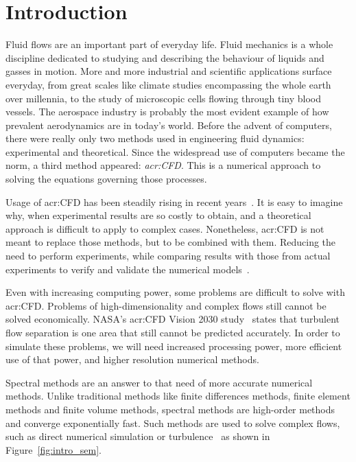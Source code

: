 \chapter{Introduction}

Fluid flows are an important part of everyday life. Fluid mechanics is a whole discipline dedicated
to studying and describing the behaviour of liquids and gasses in motion. More and more industrial
and scientific applications surface everyday, from great scales like climate studies encompassing
the whole earth over millennia, to the study of microscopic cells flowing through tiny blood
vessels. The aerospace industry is probably the most evident example of how prevalent aerodynamics
are in today's world. Before the advent of computers, there were really only two methods used in
engineering fluid dynamics: experimental and theoretical. Since the widespread use of computers
became the norm, a third method appeared: \textit{\acrfull{acr:CFD}}. This is a numerical approach
to solving the equations governing those processes.

Usage of \acrshort{acr:CFD} has been steadily rising in recent years~\cite{Slotnick2014}. It is easy
to imagine why, when experimental results are so costly to obtain, and a theoretical approach is
difficult to apply to complex cases. Nonetheless, \acrshort{acr:CFD} is not meant to replace those
methods, but to be combined with them. Reducing the need to perform experiments, while comparing
results with those from actual experiments to verify and validate the numerical
models~\cite{Stern2001}.

Even with increasing computing power, some problems are difficult to solve with \acrshort{acr:CFD}.
Problems of high-dimensionality and complex flows still cannot be solved economically. NASA's
\acrshort{acr:CFD} Vision 2030 study~\cite{Slotnick2014} states that turbulent flow separation is
one area that still cannot be predicted accurately. In order to simulate these problems, we will
need increased processing power, more efficient use of that power, and higher resolution numerical
methods.

Spectral methods are an answer to that need of more accurate numerical methods. Unlike traditional
methods like finite differences methods, finite element methods and finite volume methods, spectral
methods are high-order methods and converge exponentially fast. Such methods are used to solve
complex flows, such as direct numerical simulation or turbulence~\cite{Cantwell2015} as shown in
Figure~\ref{fig:intro_sem}. 

